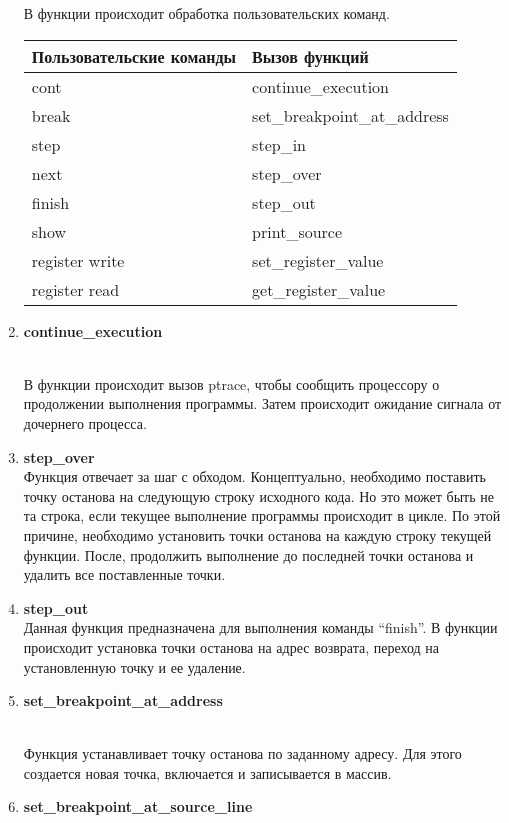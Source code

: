 \documentclass[a4paper,14pt,oneside]{extreport}  %
\begin{document}
\begin{enumerate}
	В функции происходит обработка пользовательских команд. 
	\begin{table}[h]
		\begin{center}
			\begin{tabular}{|p{4cm}|p{6cm}|}
				\hline 
				Пользовательские команды & Вызов функций \\ \hline
				cont  & continue\_execution \\ \hline
				break & set\_breakpoint\_at\_address  \\ \hline
				step & step\_in \\ \hline
				next & step\_over \\ \hline
				finish & step\_out \\ \hline
				show & print\_source  \\ \hline
				register write & set\_register\_value  \\ \hline
				register read & get\_register\_value  \\ \hline
			\end{tabular}
		\end{center}
	\end{table}
	\item {\bf continue\_execution}
	\begin{figure}[h!]
		\center{\texttt{[image: 4]}}
		\caption{}
	\end{figure}
	\\
	В функции происходит вызов ptrace, чтобы сообщить процессору о продолжении выполнения программы. Затем происходит ожидание сигнала от дочернего процесса. 
	\item  {\bf step\_over} \\
	
	Функция отвечает за шаг с обходом. Концептуально, необходимо поставить точку останова на следующую строку исходного кода. Но это может быть не та строка, если текущее выполнение программы происходит в цикле. По этой причине, необходимо установить точки останова на каждую строку текущей функции. После, продолжить выполнение до последней точки останова и удалить все поставленные точки. 
	\item {\bf step\_out} \\
	
	Данная функция предназначена для выполнения команды “finish”. В функции происходит установка точки останова на адрес возврата, переход на установленную точку и ее удаление. 
	\item {\bf set\_breakpoint\_at\_address}
	\begin{figure}[h!]
		\center{\texttt{[image: 5]}}
		\caption{}
	\end{figure}
	\\
	Функция устанавливает точку останова по заданному адресу. Для этого создается новая точка, включается и записывается в массив.
	\item  
	{\bf set\_breakpoint\_at\_source\_line}
	\begin{figure}[h!]
		\center{\texttt{[image: 6]}}
		\caption{}
	\end{figure}
	\\
	

\end{enumerate}
\end{document}
